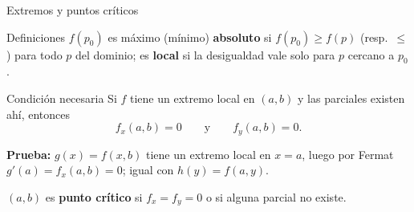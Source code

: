 \documentclass[11pt,aspectratio=169]{beamer}
\begin{document}
\begin{frame}{Extremos y puntos críticos}
  \begin{block}{Definiciones}
    $f(p_0)$ es máximo (mínimo) \textbf{absoluto} si $f(p_0)\ge f(p)$ (resp.\ $\le$) para todo $p$ del dominio; es \textbf{local} si la desigualdad vale solo para $p$ cercano a $p_0$.
  \end{block}
  \pause
  \begin{block}{Condición necesaria}
    Si $f$ tiene un extremo local en $(a,b)$ y las parciales existen ahí, entonces
    \[
      f_x(a,b)=0 \qquad\text{y}\qquad f_y(a,b)=0.
    \]
  \end{block}
  \pause
  \vspace{2pt}
  {\small\textbf{Prueba:} $g(x)=f(x,b)$ tiene un extremo local en $x=a$, luego por Fermat $g'(a)=f_x(a,b)=0$; igual con $h(y)=f(a,y)$.}
  \pause
  \vspace{4pt}
  \begin{center}\small\color{gray60} $(a,b)$ es \textbf{punto crítico} si $f_x=f_y=0$ o si alguna parcial no existe.\end{center}
\end{frame}
\end{document}
